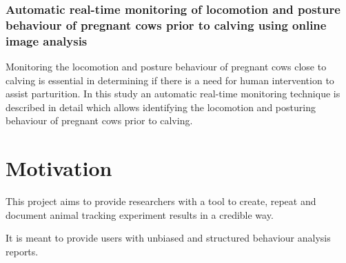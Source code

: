 \subsubsection{Automatic real-time monitoring of locomotion and posture behaviour of pregnant cows prior to calving using online image analysis \cite{Cangar200853}}
Monitoring the locomotion and posture behaviour of pregnant cows close to calving is essential in determining if there is a need for human intervention to assist parturition. In this study an automatic real-time monitoring technique is described in detail which allows identifying the locomotion and posturing behaviour of pregnant cows prior to calving.

\section{Motivation}

This project aims to provide researchers with a tool to create, repeat and document animal tracking experiment results in a credible way.

It is meant to provide users with unbiased and structured behaviour analysis reports.
